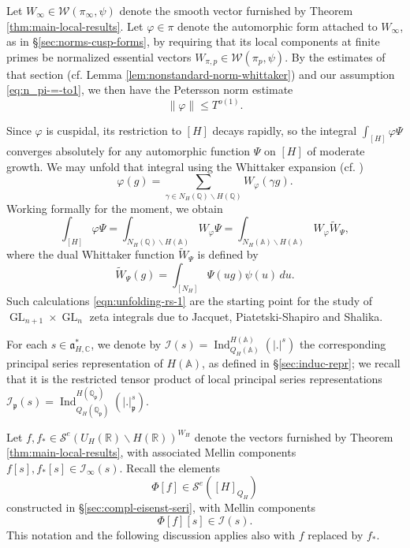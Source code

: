 \documentclass[reqno]{amsart}
\DeclareMathOperator{\GL}{GL}
\DeclareMathOperator{\Ind}{Ind}
\theoremstyle{plain} \newtheorem{theorem} {Theorem}
\theoremstyle{definition} \newtheorem{definition} [theorem] {Definition}
\theoremstyle{itplain} %
\numberwithin{equation}{section}
\numberwithin{theorem}{section}
\renewcommand{\leq}{\leqslant}
\begin{document}
Let $W_{\infty} \in \mathcal{W}(\pi_\infty, \psi)$ denote the smooth vector furnished by Theorem \ref{thm:main-local-results}.  Let $\varphi \in \pi$ denote the automorphic form attached to $W_{\infty}$, as in \S\ref{sec:norms-cusp-forms}, by requiring that its local components at finite primes be normalized essential vectors $W_{\pi,p} \in \mathcal{W}(\pi_p, \psi)$.  By the estimates of that section (cf. Lemma \ref{lem:nonstandard-norm-whittaker}) and our assumption \eqref{eq:n_pi-=-to1}, we then have the Petersson norm estimate
\begin{equation}\label{eq:varphi-2-asymp}
  \|\varphi \|
  \leq T^{o(1)}.
\end{equation}

Since $\varphi$ is cuspidal, its restriction to $[H]$ decays rapidly, so the integral $\int_{[H]} \varphi \Psi$ converges absolutely for any automorphic function $\Psi$ on $[H]$ of moderate growth.  We may unfold that integral using the Whittaker expansion (cf. \cite[Thm 5.9]{MR348047})
\begin{equation*}
  \varphi(g) = \sum _{\gamma \in N_H(\mathbb{Q}) \backslash H(\mathbb{Q})} W_\varphi(\gamma g).
\end{equation*}
 Working formally for the moment, we obtain
\begin{equation}\label{eqn:unfolding-rs-1}
  \int_{[H]} \varphi \Psi
  = 
  \int_{N_H(\mathbb{Q}) \backslash H(\mathbb{A})}
  W_\varphi \Psi
  =
  \int_{N_H(\mathbb{A}) \backslash H(\mathbb{A})}
  W_\varphi \tilde{W}_{\Psi},
\end{equation}
where the dual Whittaker function $\tilde{W}_{\Psi}$ is defined by
\begin{equation*}
  \tilde{W}_{\Psi}(g)
  = \int_{[N_H]}
  \Psi(u g) \psi(u ) \, d u.
\end{equation*}
Such calculations \eqref{eqn:unfolding-rs-1} are the starting point for the study of $\GL_{n+1} \times \GL_n$ zeta integrals due to Jacquet, Piatetski-Shapiro and Shalika.

For each $s \in \mathfrak{a}_{H,\mathbb{C}}^*$, we denote by $\mathcal{I}(s) = \Ind_{Q_H(\mathbb{A})}^{H(\mathbb{A})} (|.|^s)$ the corresponding principal series representation of $H(\mathbb{A})$, as defined in \S\ref{sec:induc-repr}; we recall that it is the restricted tensor product of local principal series representations $\mathcal{I}_\mathfrak{p}(s) = \Ind_{Q_H(\mathbb{Q}_\mathfrak{p})}^{H(\mathbb{Q}_\mathfrak{p})}(|.|_{\mathfrak{p}}^s)$.

Let $f, f_{\ast} \in \mathcal{S}^e(U_H(\mathbb{R}) \backslash H(\mathbb{R}))^{W_H}$ denote the vectors furnished by Theorem \ref{thm:main-local-results}, with associated Mellin components $f[s], f_{\ast}[s] \in \mathcal{I}_\infty(s)$.  Recall the elements
\begin{equation}\label{eq:phi-:=-phif}
  \Phi[f] \in \mathcal{S}^e([H]_{Q_H})
\end{equation}
constructed in \S\ref{sec:compl-eisenst-seri}, with Mellin components
\begin{equation*}
\Phi[f][s] \in \mathcal{I}(s).
\end{equation*}
This notation and the following discussion applies also with $f$ replaced by $f_{\ast}$.
\end{document}
